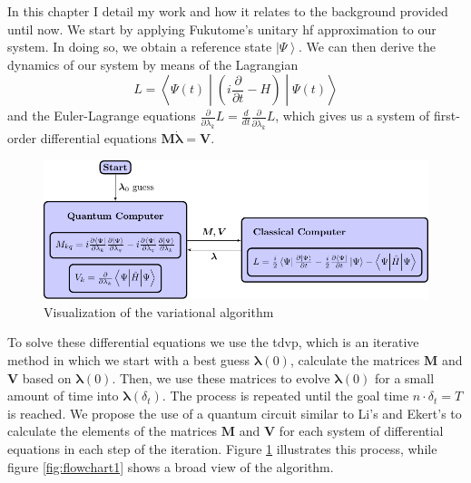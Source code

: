 \documentclass{aux/ttuthes2007}
\newcommand{\ket}[1]{\ensuremath{\left|#1\right\rangle}}
\newcommand{\sandwich}[3]{\left< #1 \middle\vert #2 \middle\vert #3 \right>}
\newcommand{\paren}[1]{\left( #1 \right)}
\newcommand{\ddt}{\frac{d}{dt}}
\newcommand{\pdt}{\frac{\partial}{\partial t}}
\newcommand{\pd}[1]{\frac{\partial}{\partial #1}}
\begin{document}
In this chapter I detail my work and how it relates to the background provided until now.
We start by applying Fukutome's \cite{fukutome} unitary \gls{hf} approximation to our system. In doing so, we obtain a reference state $\ket\Psi$.
We can then derive the dynamics of our system by means of the Lagrangian
\[
	L = \sandwich {\Psi(t)} {\paren{i\pdt - H}} {\Psi(t)}
\]
and the Euler-Lagrange equations $\pd{\lambda_k} L = \ddt \pd{\dot \lambda_k} L$, which gives us a system of first-order differential equations $\bm M \dot{\bm \lambda} = \bm V$.
%
\begin{figure}
	\centering
  \includegraphics[width=\linewidth]{img/variation_figure.pdf}
  \caption{Visualization of the variational algorithm}
  \label{fig:TDVP}
\end{figure}
%
To solve these differential equations we use the \gls{tdvp}, which is an iterative method in which we start with a best guess $\bm \lambda(0)$, calculate the matrices $\bm M$ and $\bm V$ based on $\bm \lambda(0)$.
Then, we use these matrices to evolve $\bm \lambda(0)$ for a small amount of time into $\bm \lambda(\delta_t)$.
The process is repeated until the goal time $n\cdot\delta_t = T$ is reached.
We propose the use of a quantum circuit similar to Li's \cite{benjamin} and Ekert's  to calculate the elements of the matrices $\bm M$ and $\bm V$ for each system of differential equations in each step of the iteration.
Figure \ref{fig:TDVP} illustrates this process, while figure \ref{fig:flowchart1} shows a broad view of the algorithm.
\end{document}
